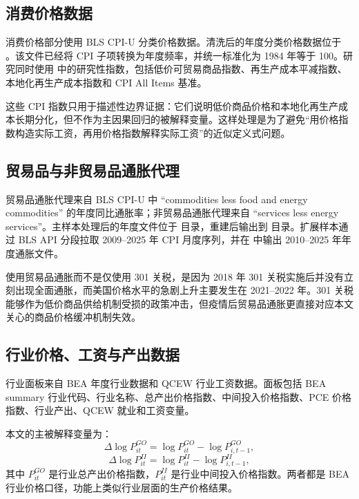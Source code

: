 \documentclass[12pt,a4paper,fontset=none]{ctexart}
\begin{document}
\subsection{消费价格数据}

消费价格部分使用 BLS CPI-U 分类价格数据。清洗后的年度分类价格数据位于 。该文件已经将 CPI 子项转换为年度频率，并统一标准化为 1984 年等于 100。研究同时使用  中的研究性指数，包括低价可贸易商品指数、再生产成本平减指数、本地化再生产成本指数和 CPI All Items 基准。

这些 CPI 指数只用于描述性边界证据：它们说明低价商品价格和本地化再生产成本长期分化，但不作为主因果回归的被解释变量。这样处理是为了避免“用价格指数构造实际工资，再用价格指数解释实际工资”的近似定义式问题。

\subsection{贸易品与非贸易品通胀代理}

贸易品通胀代理来自 BLS CPI-U 中 ``commodities less food and energy commodities'' 的年度同比通胀率；非贸易品通胀代理来自 ``services less energy services''。主样本处理后的年度文件位于  目录，重建后输出到  目录。扩展样本通过 BLS API 分段拉取 2009--2025 年 CPI 月度序列，并在  中输出 2010--2025 年年度通胀文件。

使用贸易品通胀而不是仅使用 301 关税，是因为 2018 年 301 关税实施后并没有立刻出现全面通胀，而美国价格水平的急剧上升主要发生在 2021--2022 年。301 关税能够作为低价商品供给机制受损的政策冲击，但疫情后贸易品通胀更直接对应本文关心的商品价格缓冲机制失效。

\subsection{行业价格、工资与产出数据}

行业面板来自 BEA 年度行业数据和 QCEW 行业工资数据。面板包括 BEA summary 行业代码、行业名称、总产出价格指数、中间投入价格指数、PCE 价格指数、行业产出、QCEW 就业和工资变量。

本文的主被解释变量为：
\begin{equation}
\Delta \log P^{GO}_{it}
=\log P^{GO}_{it}-\log P^{GO}_{i,t-1},
\end{equation}
\begin{equation}
\Delta \log P^{II}_{it}
=\log P^{II}_{it}-\log P^{II}_{i,t-1},
\end{equation}
其中 \(P^{GO}_{it}\) 是行业总产出价格指数，\(P^{II}_{it}\) 是行业中间投入价格指数。两者都是 BEA 行业价格口径，功能上类似行业层面的生产价格结果。
\end{document}
